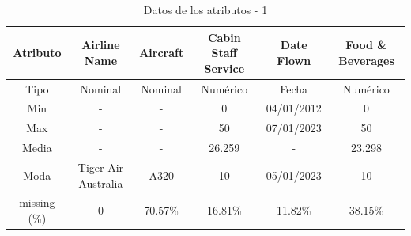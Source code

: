 \documentclass[12pt]{report} %
\begin{document}
\begin{table}[H]
    \begin{center}
        \begin{tabular}{@{}cccccc@{}}
            \toprule
            Atributo & Airline Name       & Aircraft & Cabin Staff Service & Date Flown & Food \& Beverages \\ 
            \midrule
            Tipo     & Nominal            & Nominal  & Numérico            & Fecha      & Numérico          \\ 
            Min      & -                  & -        & 0                   & 04/01/2012 & 0                 \\ 
            Max      & -                  & -        & 50                  & 07/01/2023 & 50                \\ 
            Media    & -                  & -        & 26.259              & -          & 23.298            \\ 
            Moda     & Tiger Air Australia& A320     & 10                  & 05/01/2023 & 10                \\ 
            missing (\%) & 0              & 70.57\%  & 16.81\%             & 11.82\%    & 38.15\%           \\ 
            \bottomrule
        \end{tabular} 
        \caption{Datos de los atributos - 1}
    \end{center}
\end{table}
\end{document}
